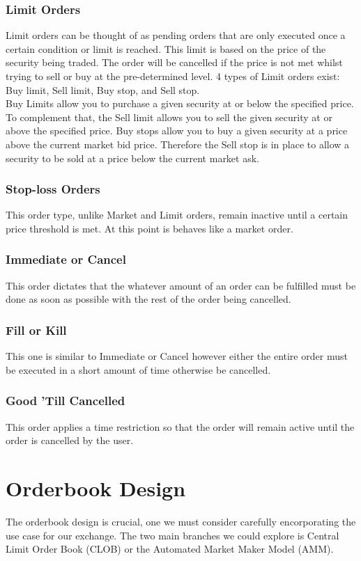 \documentclass[12pt]{article}
\begin{document}
\subsubsection{Limit Orders}
Limit orders can be thought of as pending orders that are only executed once a 
certain condition or limit is reached. This limit is based on the price of the
security being traded. The order will be cancelled if the price is not met 
whilst trying to sell or buy at the pre-determined level. 4 types of Limit 
orders exist: Buy limit, Sell limit, Buy stop, and Sell stop. 
\\
Buy Limits allow you to purchase a given security at or below the specified 
price. To complement that, the Sell limit allows you to sell the given security
at or above the specified price. 
Buy stops allow you to buy a given security at a price above the current
market bid price. Therefore the Sell stop is in place to allow a security to 
be sold at a price below the current market ask.

\subsubsection{Stop-loss Orders}
This order type, unlike Market and Limit orders, remain inactive until a certain
price threshold is met. At this point is behaves like a market order.

\subsubsection{Immediate or Cancel}
This order dictates that the whatever amount of an order can be fulfilled must 
be done as soon as possible with the rest of the order being cancelled.


\subsubsection{Fill or Kill}
This one is similar to Immediate or Cancel however either the entire order must
be executed in a short amount of time otherwise be cancelled. 


\subsubsection{Good 'Till Cancelled}
This order applies a time restriction so that the order will remain active 
until the order is cancelled by the user.


\section{Orderbook Design}
The orderbook design is crucial, one we must consider carefully encorporating
the use case for our exchange. The two main branches we could explore is 
Central Limit Order Book (CLOB) or the Automated Market Maker Model (AMM). 
\end{document}
